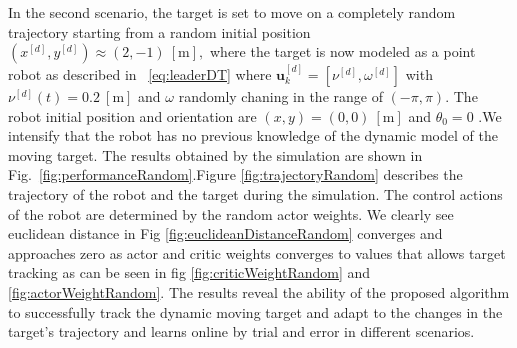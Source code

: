 \documentclass[conference]{IEEEtran}
\begin{document}
In the second scenario, the target is set to move on a completely random trajectory starting from a random initial position $(x^{[d]},y^{[d]})\approx (2,-1)~[\si{\meter}],$ where the target is now modeled as a point robot as described in ~\eqref{eq:leaderDT}
 where $\mathbf{u}_k^{[d]}=[\nu^{[d]},\omega^{[d]}] $ with $\nu^{[d]}(t)=0.2~[\si{\meter}]$ and $\omega$ randomly chaning in the range of $({-\pi},{\pi}) $.  The robot initial position and orientation are $(x,y) = (0,0)~[\si{\meter}]$ and $\theta_0=0$ .We intensify that the robot has no previous knowledge of the dynamic model of the moving target. The results obtained by the simulation are shown in Fig.~\ref{fig:performanceRandom}.Figure \ref{fig:trajectoryRandom} describes the trajectory of the robot and the target during the simulation. The control actions of the robot are determined by the random actor weights. We clearly see euclidean distance in Fig \ref{fig:euclideanDistanceRandom} converges and approaches zero as actor and critic weights converges to values that allows target tracking as can be seen in fig \ref{fig:criticWeightRandom} and \ref{fig:actorWeightRandom}. The results reveal the ability of the proposed algorithm to successfully track the dynamic moving target and adapt to the changes in the target's trajectory and learns online by trial and error in different scenarios. %
%    
\end{document}
